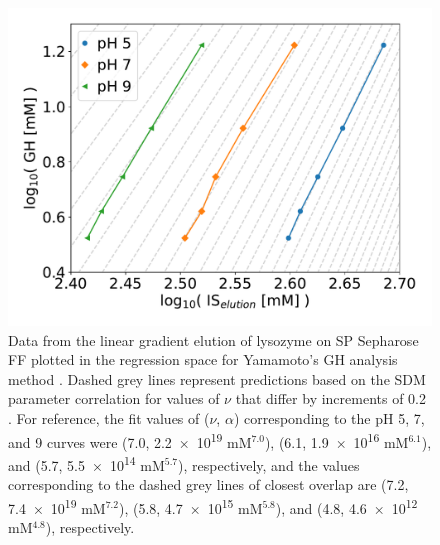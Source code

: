 \documentclass[11pt,a4paper]{article}
\providecommand{\DIFaddtex}[1]{{\protect\color{blue} \sf #1}} %
\providecommand{\DIFaddFL}[1]{\DIFadd{#1}} %
\providecommand{\DIFaddbeginFL}{} %
\providecommand{\DIFaddendFL}{} %
\providecommand{\DIFdelbeginFL}{} %
\providecommand{\DIFdelendFL}{} %
\providecommand{\DIFadd}[1]{\texorpdfstring{\DIFaddtex{#1}}{#1}} %
\begin{document}
\begin{figure}[htbp]
    \centering
    \DIFdelbeginFL %
\DIFdelendFL \DIFaddbeginFL \includegraphics[width=\textwidth]{figure_8}
    \DIFaddendFL \caption{
    Data from the linear gradient elution of lysozyme on SP Sepharose FF plotted in the regression space for Yamamoto's GH analysis method \cite{main-Yamamoto1987}. Dashed grey lines represent predictions based on the SDM parameter correlation for values of $\nu$ that differ by increments of 0.2\DIFaddbeginFL \DIFaddFL{. For reference, the fit values of ($\nu$, $\alpha$) corresponding to the pH 5, 7, and 9 curves were (7.0, }\num{2.2e+19} \DIFaddFL{mM$^{7.0}$), (6.1, }\num{1.9e+16} \DIFaddFL{mM$^{6.1}$), and (5.7, }\num{5.5e+14} \DIFaddFL{mM$^{5.7}$), respectively, and the values corresponding to the dashed grey lines of closest overlap are (7.2, }\num{7.4e19} \DIFaddFL{mM$^{7.2}$), (5.8, }\num{4.7e15} \DIFaddFL{mM$^{5.8}$), and (4.8, }\num{4.6e12} \DIFaddFL{mM$^{4.8}$), respectively}\DIFaddendFL .
    }
    \label{fig:lge overlay}
\end{figure}
\end{document}
